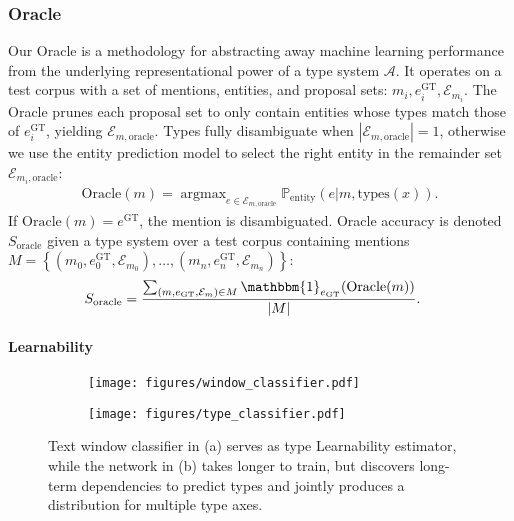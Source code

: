 \documentclass[letterpaper]{article}
\DeclareMathOperator*{\argmax}{argmax}
\begin{document}
\subsubsection{Oracle}
\label{para:oracle}
Our Oracle is a methodology for abstracting away machine learning performance from the underlying representational power of a type system $\mathcal{A}$. It operates on a test corpus with a set of mentions, entities, and proposal sets: $m_i, e_{i}^{\mathrm{GT}}, \mathcal{E}_{m_i}$. The Oracle prunes each proposal set to only contain entities whose types match those of $e_{i}^{\mathrm{GT}}$, yielding $\mathcal{E}_{m,\mathrm{oracle}}$. Types fully disambiguate when $|\mathcal{E}_{m,\mathrm{oracle}}|=1$, otherwise we use the entity prediction model to select the right entity in the remainder set $\mathcal{E}_{m_i,\mathrm{oracle}}$:
\begin{align}
 \mathrm{Oracle}(m) = \argmax_{e \in \mathcal{E}_{m, \mathrm{oracle}}}\mathbb P_{\mathrm{entity}}(e|m, \mathrm{types}(x)).
\end{align}
If $\mathrm{Oracle}(m) = e^{\mathrm{GT}}$, the mention is disambiguated. Oracle accuracy is denoted $S_{\mathrm{oracle}}$ given a type system over a test corpus containing mentions $M=\left\{(m_0, e_{0}^{\mathrm{GT}}, \mathcal{E}_{m_0}),\dots,(m_n, e_{n}^{\mathrm{GT}}, \mathcal{E}_{m_n})\right\}$:
\begin{align}
S_{\mathrm{oracle}} &= \frac{\sum_{(m, e_{\mathrm{GT}}, \mathcal{E}_m)\in M} \mathbbm{1}_{e_{\mathrm{GT}}} (\mathrm{Oracle}(m))}{|M|}.
\end{align}

\paragraph{Learnability}
\begin{figure}[ht]
    \centering
    \begin{subfigure}{0.45\linewidth}
    \texttt{[image: figures/window\_classifier.pdf]}
    \caption{}
    \label{fig:windowclassifier}
    \end{subfigure}
    \begin{subfigure}{0.45\linewidth}
    \texttt{[image: figures/type\_classifier.pdf]}
    \caption{}
    \label{fig:bilstm}
    \end{subfigure}
    \caption{Text window classifier in (a) serves as type Learnability estimator, while the network in (b) takes longer to train, but discovers long-term dependencies to predict types and jointly produces a distribution for multiple type axes.}
\end{figure}
\end{document}
